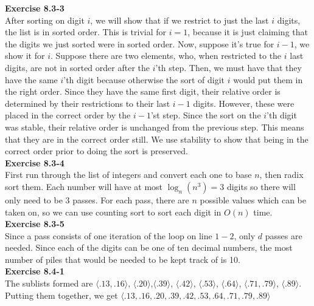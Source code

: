 \documentclass{article}
\begin{document}
\noindent\textbf{Exercise 8.3-3}\\

After sorting on digit $i$, we will show that if we restrict to just the last $i$ digits, the list is in sorted order. This is trivial for $i=1$, because it is just claiming that the digits we just sorted were in sorted order. Now, suppose it's true for $i-1$, we show it for $i$. Suppose there are two elements, who, when restricted to the $i$ last digits, are not in sorted order after the $i$'th step. Then, we must have that they have the same $i$'th digit because otherwise the sort of digit $i$ would put them in the right order. Since they have the same first digit, their relative order is determined by their restrictions to their last $i-1$ digits. However, these were placed in the correct order by the $i-1$'st step. Since the sort on the $i$'th digit was stable, their relative order is unchanged from the previous step. This means that they are in the correct order still. We use stability to show that being in the correct order prior to doing the sort is preserved.\\

\noindent\textbf{Exercise 8.3-4}\\

First run through the list of integers and convert each one to base $n$, then radix sort them.  Each number will have at most $\log_n(n^3) = 3$ digits so there will only need to be 3 passes. For each pass, there are $n$ possible values which can be taken on, so we can use counting sort to sort each digit in $O(n)$ time.\\

\noindent\textbf{Exercise 8.3-5}\\

Since a pass consists of one iteration of the loop on line $1-2$, only $d$ passes are needed. Since each of the digits can be one of ten decimal numbers, the most number of piles that would be needed to be kept track of is 10.\\

\noindent\textbf{Exercise 8.4-1}\\

The sublists formed are $\langle .13, .16\rangle$, $\langle .20\rangle$,$\langle .39\rangle$, $\langle .42\rangle$, $\langle .53\rangle$, $\langle .64\rangle$, $\langle .71, .79\rangle$, $\langle .89\rangle$. Putting them together, we get $\langle .13,.16,.20,.39,.42,.53,.64,.71,.79,.89 \rangle$\\
\end{document}

